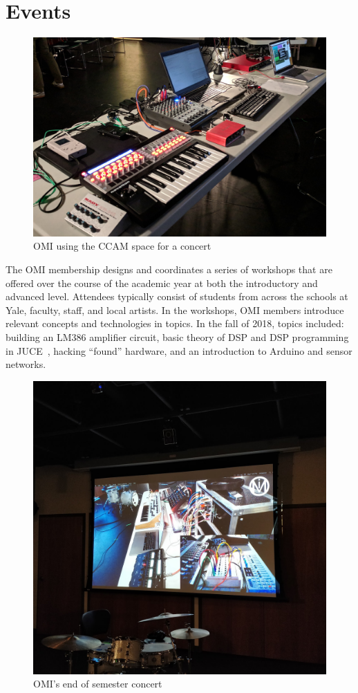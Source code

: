 \section{Events}

\begin{figure}[!h]
    \centering
    \includegraphics[width=0.85\columnwidth]{figs/concert.jpg}
    \caption{OMI using the CCAM space for a concert}
    \label{fig:concert}
\end{figure}

The OMI membership designs and coordinates a series of workshops that are offered over the course of the academic year at both the introductory and advanced level. Attendees typically consist of students from across the schools at Yale, faculty, staff, and local artists. In the workshops, OMI members introduce relevant concepts and technologies in topics. In the fall of 2018, topics included: building an LM386 amplifier circuit, basic theory of DSP and DSP programming in JUCE~\cite{juce}, hacking ``found'' hardware, and an introduction to Arduino and sensor networks.


 
\begin{figure}
    \centering
    \includegraphics[width=0.85\columnwidth]{figs/concert2.jpg}
    \caption{OMI's end of semester concert}
    \label{fig:concert}
\end{figure}
 
